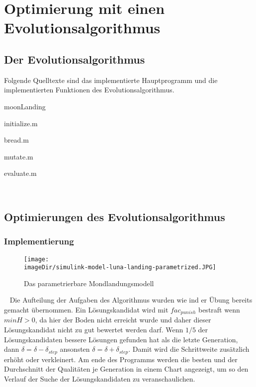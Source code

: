 \section{Optimierung mit einen Evolutionsalgorithmus}
\subsection{Der Evolutionsalgorithmus}
Folgende Quelltexte sind das implementierte Hauptprogramm und die implementierten Funktionen des Evolutionsalgorithmus.

\begin{code}
	\caption{moonLanding}
	\label{fig:moon-landing-m}
\end{code}

\begin{code}
	\caption{initialize.m}
	\label{fig:initialize-m}
\end{code}

\begin{code}
	\caption{bread.m}
	\label{fig:bread-m}
\end{code}

\begin{code}
	\caption{mutate.m}
	\label{fig:mutate-m}
\end{code}

\begin{code}
	\caption{evaluate.m}
	\label{fig:evaluate-m}
\end{code}
\ \newpage

\subsection{Optimierungen des Evolutionsalgorithmus}
\subsubsection{Implementierung}
\begin{figure}[h]
	\centering
	\texttt{[image: \\imageDir/simulink-model-luna-landing-parametrized.JPG]}
	\caption{Das parametrierbare Mondlandungsmodell}
	\label{fig:simulink-model-luna-landing-parametrized}
\end{figure}
\ \newline
Die Aufteilung der Aufgaben des Algorithmus wurden wie ind er Übung bereits gemacht übernommen. Ein Lösungskandidat wird mit $fac_{punish}$ bestraft wenn $minH > 0$, da hier der Boden nicht erreicht wurde und daher dieser Lösungskandidat nicht zu gut bewertet werden darf. Wenn $1/5$ der Lösungskandidaten bessere Lösungen gefunden hat als die letzte Generation, dann $\delta = \delta - \delta_{step}$ ansonsten $\delta = \delta + \delta_{step}$. Damit wird die Schrittweite zusätzlich erhöht oder verkleinert. 
\newline
\newline
Am ende des Programms werden die besten und der Durchschnitt der Qualitäten je Generation in einem Chart angezeigt, um so den Verlauf der Suche der Lösungskandidaten zu veranschaulichen.

